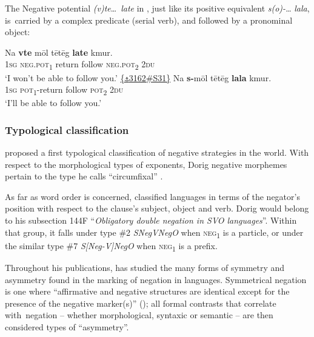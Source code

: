 \documentclass[output=paper,colorlinks,citecolor=brown,draft]{langscibook}
\begin{document}
The Negative potential \textit{(v)te}\ldots\ \textit{late} in , just like its positive equivalent  \textit{s(o)-}… \textit{lala}, is~carried by a complex predicate (serial verb), and followed by a pronominal object: 

\ea\label{ex:dor:follow}
    \ea\label{ex:dor:follow1}
        \gll   Na \textbf{vte} mōl tētēg \textbf{late} kmur. \\ 
              \textsc{1sg} \textsc{neg.pot\textsubscript{1}} return follow \textsc{neg.pot\textsubscript{2}} \textsc{2du}\\
         \quad ‘I won’t be able to follow you.’ \quad  \href{https://doi.org/10.24397/pangloss-0003162#S31}{\{\texttt{⚓}3162\#S31\}} 
    \ex\label{ex:dor:follow2}
        \gll  Na \textbf{s-}mōl tētēg \textbf{lala} kmur. \\
              \textsc{1sg} \textsc{pot\textsubscript{1}}-return follow \textsc{pot\textsubscript{2}} \textsc{2du}\\
         \quad ‘I’ll be able to follow you.’
    \z
\z 

\subsubsection{Typological classification}\label{sec:dor:2.1.2}

\citet{Dahl1979} proposed a first typological classification of negative strategies in the world. With respect to the morphological types of exponents, Dorig negative morphemes pertain to the type he calls “circumfixal” \citep[100]{Dahl1979}.

As far as word order is concerned, \citet{Dryer2013-wals144} classified languages in terms of the negator’s position with respect to the clause’s subject, object and verb. Dorig would belong to his subsection 144F “\textit{Obligatory double negation in SVO languages}”. Within that group, it falls under type \#2 \textit{SNegVNegO} when \textsc{neg\textsubscript{1}} is a particle, or under the similar type \#7 \textit{S[Neg-V]NegO} when \textsc{neg\textsubscript{1}} is a prefix.

Throughout his publications, \citet{Miestamo2005,Miestamo2007,Miestamo2013-wals114,Miestamo2013-wals113} has studied the many forms of symmetry and asymmetry found in the marking of negation in languages. Symmetrical negation is one where “affirmative and negative structures are identical except for the presence of the negative marker(s)” (\citealt[72]{Miestamo2005}); all formal contrasts that correlate with~negation – whether morphological, syntaxic or semantic – are then considered types of “asymmetry”. 
\end{document}
